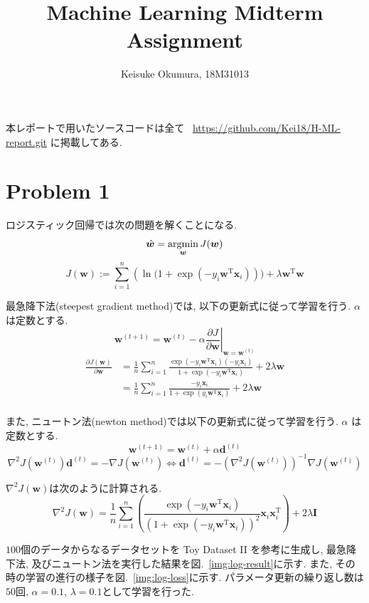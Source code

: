\documentclass[a4paper,10pt]{jsarticle}
\title{Machine Learning Midterm Assignment}
\author{Keisuke Okumura, 18M31013}
\newcommand{\argmin}{\mathop{\rm argmin}\limits}
\newcommand{\coloneq}{:=}
\begin{document}
\maketitle

\noindent
本レポートで用いたソースコードは全て
~\underline{https://github.com/Kei18/H-ML-report.git}
に掲載してある.

\section*{Problem 1}
ロジスティック回帰では次の問題を解くことになる.
\[ \hat{\bm{w}} = \argmin_{\bm{w}}J(\bm{w}) \]
\[
 J(\bm{w}) \coloneq \sum_{i=1}^{n}(
 \ln{(1 + \exp{(-y_i\bm{w}^\mathrm{T}\bm{x}_i)}}))
 + \lambda \bm{w}^\mathrm{T}\bm{w}
\]

最急降下法(steepest gradient method)では, 以下の更新式に従って学習を行う. $\alpha$ は定数とする.
\[
\bm{w}^{(t+1)} = \bm{w}^{(t)} - \alpha\left.\frac{\partial J}{\partial \bm{w}}\right|_{\bm{w}=\bm{w}^{(t)}}
\]
\begin{align*}
\frac{\partial J(\bm{w})}{\partial \bm{w}}
 &= \frac{1}{n}\sum_{i=1}^{n}
 \frac{\exp(-y_i\bm{w}^\mathrm{T}\bm{x}_i)(-y_i\bm{x}_i)}
 {1 + \exp(-y_i\bm{w}^\mathrm{T}\bm{x}_i)}
 + 2\lambda\bm{w}\\
 &=\frac{1}{n}\sum_{i=1}^{n}
 \frac{-y_i\bm{x}_i}
 {1 + \exp(y_i\bm{w}^\mathrm{T}\bm{x}_i)}
 + 2\lambda\bm{w}\\
\end{align*}

また, ニュートン法(newton method)では以下の更新式に従って学習を行う. $\alpha$ は定数とする.
\[ \bm{w}^{(t+1)} = \bm{w}^{(t)} + \alpha\bm{d}^{(t)} \]
\[ \nabla^2J(\bm{w}^{(t)})\bm{d}^{(t)} = -\nabla J(\bm{w}^{(t)})
\Longleftrightarrow
\bm{d}^{(t)} = - (\nabla^2J(\bm{w}^{(t)}))^{-1} \nabla J(\bm{w}^{(t)})
\]

$\nabla^2J(\bm{w})$は次のように計算される.
\[
 \nabla^2J(\bm{w}) = \frac{1}{n}\sum_{i=1}^{n}
 \left(\frac{\exp(-y_i\bm{w}^\mathrm{T}\bm{x}_i)}
 {(1 + \exp(-y_i\bm{w}^\mathrm{T}\bm{x}_i))^2}\bm{x}_i\bm{x}_i^\mathrm{T}\right) + 2\lambda\bm{I}
\]

$100$個のデータからなるデータセットを Toy Dataset I\hspace{-1pt}I を参考に生成し,
最急降下法, 及びニュートン法を実行した結果を図.~\ref{img:log-result}に示す.
また, その時の学習の進行の様子を図.~\ref{img:log-loss}に示す.
パラメータ更新の繰り返し数は$50$回, $\alpha=0.1$, $\lambda=0.1$として学習を行った.
\end{document}

